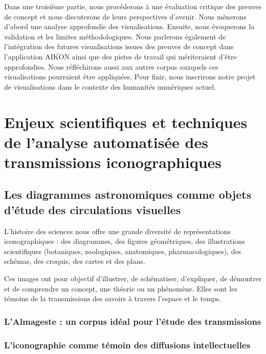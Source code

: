 \documentclass[a4paper,12pt,twoside]{book}
\begin{document}
	Dans une troisième partie, nous procéderons à une évaluation critique des preuves de concept et nous discuterons de leurs perspectives d'avenir. Nous mènerons d'abord une analyse approfondie des visualisations. Ensuite, nous évoquerons la validation et les limites méthodologiques. Nous parlerons également de l'intégration des futures visualisations issues des preuves de concept dans l'application AIKON ainsi que des pistes de travail qui mériteraient d'être approfondies. Nous réfléchirons aussi aux autres corpus auxquels ces visualisations pourraient être appliquées. Pour finir, nous inscrirons notre projet de visualisations dans le contexte des humanités numériques actuel.
	
	
	\thispagestyle{empty}
	\cleardoublepage
	
	\mainmatter
	
	\part{Enjeux scientifiques et techniques de l'analyse automatisée des transmissions iconographiques}

	
	\chapter[Les diagrammes astronomiques]{Les diagrammes astronomiques comme objets d'étude des circulations visuelles}
	
	L'histoire des sciences nous offre une grande diversité de représentations iconographiques : des diagrammes, des figures géométriques, des illustrations scientifiques (botaniques, zoologiques, anatomiques, pharmacologiques), des schémas, des croquis, des cartes et des plans.
	
	Ces images ont pour objectif d'illustrer, de schématiser, d'expliquer, de démontrer et de comprendre un concept, une théorie ou un phénomène. Elles sont les témoins de la transmissions des savoirs à travers l'espace et le temps.
	
	
	\section[Un corpus idéal pour l'étude des transmissions]{L'Almageste : un corpus idéal pour l'étude des transmissions}
	

	
	
	
	\section[L'iconographie témoin des diffusions intellectuelles]{L'iconographie comme témoin des diffusions intellectuelles}
\end{document}
